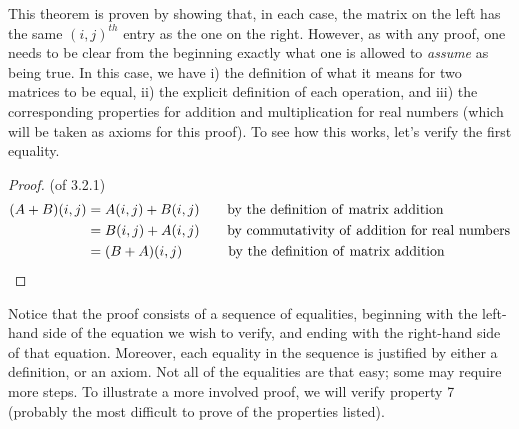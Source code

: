 \documentclass[handout]{ximera}
\begin{document}
This theorem is proven by showing that, in each case, the matrix on the left has the same $(i,j)^{th}$ entry as the one on the right. However, as with any proof, one needs to be clear from the beginning exactly what one is allowed to {\it assume} as being true. In this case, we have i) the definition of what it means for two matrices to be equal, ii) the explicit definition of each operation, and iii) the corresponding properties for addition and multiplication for real numbers (which will be taken as axioms for this proof). To see how this works, let's verify the first equality. 

\begin{proof} (of 3.2.1)
\begin{align*}
(A+B)(i,j) &= A(i,j) + B(i,j)\qquad{\rm by\ the\ definition\ of\ matrix\ addition}\\
                &= B(i,j) + A(i,j)\qquad{\rm by\ commutativity\ of\ addition\ for\ real\ numbers}\\
               &= (B+A)(i,j)\qquad\quad\ {\rm by\ the\ definition\ of\ matrix\ addition}
\end{align*}
\end{proof}

Notice that the proof consists of a sequence of equalities, beginning with the left-hand side of the equation we wish to verify, and ending with the right-hand side of that equation. Moreover, each equality in the sequence is justified by either a definition, or an axiom. Not all of the equalities are that easy; some may require more steps. To illustrate a more involved proof, we will verify property 7 (probably the most difficult to prove of the properties listed).
\end{document}
